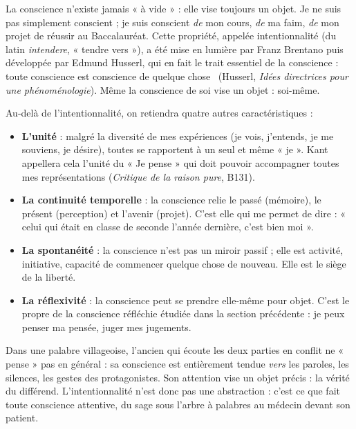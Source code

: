 \documentclass[11pt]{article}
\newcommand{\cle}[1]{{\popxbold\color{popdark}#1}}
\begin{document}
\begin{propriete}
La conscience n'existe jamais « à vide » : elle vise toujours un objet. Je ne suis pas simplement conscient ; je suis conscient \emph{de} mon cours, \emph{de} ma faim, \emph{de} mon projet de réussir au Baccalauréat. Cette propriété, appelée \cle{intentionnalité} (du latin \emph{intendere}, « tendre vers »), a été mise en lumière par Franz Brentano puis développée par Edmund Husserl, qui en fait le trait essentiel de la conscience : \guillemotleft toute conscience est conscience de quelque chose \guillemotright\ (Husserl, \emph{Idées directrices pour une phénoménologie}). Même la conscience de soi vise un objet : soi-même.
\end{propriete}

Au-delà de l'intentionnalité, on retiendra quatre autres caractéristiques :

\begin{itemize}
\item \textbf{L'unité} : malgré la diversité de mes expériences (je vois, j'entends, je me souviens, je désire), toutes se rapportent à un seul et même « je ». Kant appellera cela l'unité du « Je pense » qui doit pouvoir accompagner toutes mes représentations (\emph{Critique de la raison pure}, B131).
\item \textbf{La continuité temporelle} : la conscience relie le passé (mémoire), le présent (perception) et l'avenir (projet). C'est elle qui me permet de dire : « celui qui était en classe de seconde l'année dernière, c'est bien moi ».
\item \textbf{La spontanéité} : la conscience n'est pas un miroir passif ; elle est activité, initiative, capacité de commencer quelque chose de nouveau. Elle est le siège de la liberté.
\item \textbf{La réflexivité} : la conscience peut se prendre elle-même pour objet. C'est le propre de la conscience réfléchie étudiée dans la section précédente : je peux penser ma pensée, juger mes jugements.
\end{itemize}

\begin{exemplebox}
Dans une palabre villageoise, l'ancien qui écoute les deux parties en conflit ne « pense » pas en général : sa conscience est entièrement tendue \emph{vers} les paroles, les silences, les gestes des protagonistes. Son attention vise un objet précis : la vérité du différend. L'intentionnalité n'est donc pas une abstraction : c'est ce que fait toute conscience attentive, du sage sous l'arbre à palabres au médecin devant son patient.
\end{exemplebox}
\end{document}
